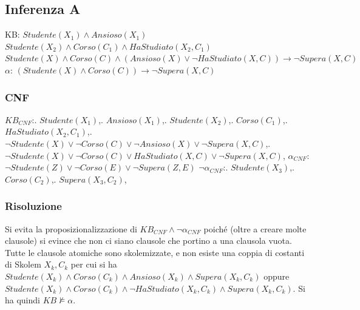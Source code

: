 \documentclass[a4paper, 12pt]{article}
\begin{document}
\subsection{Inferenza A}
KB: \newline
$Studente(X_1)\land Ansioso(X_1)$ \newline
$Studente(X_2) \land Corso(C_1) \land HaStudiato(X_2, C_1)$ \newline
$Studente(X)\land Corso(C) \land (Ansioso(X) \lor \lnot HaStudiato(X,C)) \rightarrow \lnot Supera(X, C)$ \newline
$\alpha$:\newline
$(Studente(X) \land Corso(C)) \rightarrow \lnot Supera(X, C)$ \newline
\subsubsection{CNF}
$KB_{CNF}$:. \;\;$ Studente(X_1) $,. \;\;$ Ansioso(X_1) $,. \;\;$ Studente(X_2) $,. \;\;$ Corso(C_1) $,. \;\;$ HaStudiato(X_2, C_1) $,. \;\;$ \lnot Studente(X) \lor \lnot Corso(C) \lor \lnot Ansioso(X) \lor \lnot Supera(X, C) $,. \;\;$ \lnot Studente(X) \lor \lnot Corso(C) \lor HaStudiato(X, C) \lor \lnot Supera(X, C) $,\newline
$\alpha_{CNF}$:\newline
$\lnot Studente(Z) \lor \lnot Corso(E) \lor \lnot Supera(Z, E)$\newline
$\lnot \alpha_{CNF}$:. \;\;$ Studente(X_3) $,. \;\;$ Corso(C_2) $,. \;\;$ Supera(X_3,C_2) $,\newline
\subsubsection{Risoluzione}
Si evita la proposizionalizzazione di $KB_{CNF} \land \lnot \alpha_{CNF}$ poiché (oltre a creare molte clausole) si evince che non
ci siano clausole che portino a una clausola vuota. Tutte le clausole atomiche sono skolemizzate, e non esiste
una coppia di costanti di Skolem $X_k,C_k$ per cui si ha $Studente(X_k) \land Corso(C_k) \land Ansioso(X_k) \land Supera(X_k, C_k)$ oppure
$Studente(X_k) \land Corso(C_k) \land \lnot HaStudiato(X_k, C_k) \land Supera(X_k, C_k)$.
Si ha quindi $KB \not \models \alpha$.
\end{document}
